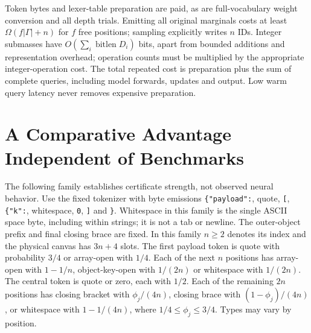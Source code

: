 \documentclass[12pt]{article}
\theoremstyle{readable}
\newcommand{\vocab}{\Gamma}
\begin{document}
Token bytes and lexer-table preparation are paid, as are full-vocabulary
weight conversion and all depth trials. Emitting all original marginals costs
at least $\Omega(f|\vocab|+n)$ for $f$ free positions; sampling explicitly writes
$n$ IDs. Integer submasses have $O(\sum_i\operatorname{bitlen}D_i)$ bits, apart
from bounded additions and representation overhead; operation counts must
be multiplied by the appropriate integer-operation cost. The total repeated
cost is preparation plus the sum of complete queries, including model forwards,
updates and output. Low warm query latency never removes expensive preparation.

\section{A Comparative Advantage Independent of Benchmarks}

The following family establishes certificate strength, not observed neural
behavior. Use the fixed tokenizer with byte emissions
\verb|{"payload":|, quote, \verb|[|, \verb|{"k":|, whitespace, \verb|0|,
\verb|]| and \verb|}|. Whitespace in this family is the single ASCII space
byte, including within strings; it is not a tab or newline.
The outer-object prefix and final closing brace are
fixed. In this family $n\ge2$ denotes its index and the physical canvas has
$3n+4$ slots. The first payload token is quote with
probability $3/4$ or array-open with $1/4$. Each of the next $n$ positions has
array-open with $1-1/n$, object-key-open with $1/(2n)$ or whitespace with
$1/(2n)$. The central token is quote or zero, each with $1/2$. Each of the
remaining $2n$ positions has closing bracket with $\phi_j/(4n)$, closing brace
with $(1-\phi_j)/(4n)$, or whitespace with $1-1/(4n)$, where
$1/4\le\phi_j\le3/4$. Types may vary by position.
\end{document}
